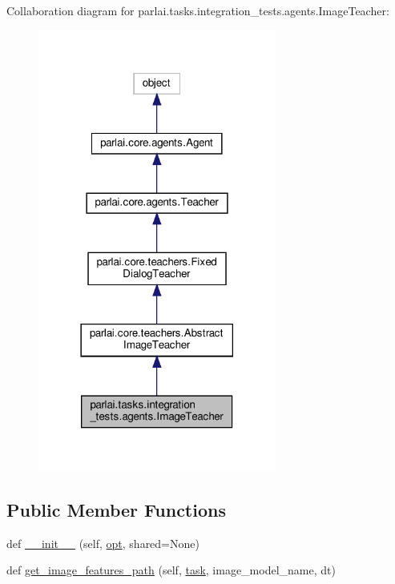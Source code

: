 Collaboration diagram for parlai.\+tasks.\+integration\+\_\+tests.\+agents.\+Image\+Teacher\+:
\nopagebreak
\begin{figure}[H]
\begin{center}
\leavevmode
\includegraphics[width=222pt]{classparlai_1_1tasks_1_1integration__tests_1_1agents_1_1ImageTeacher__coll__graph}
\end{center}
\end{figure}
\subsection*{Public Member Functions}
\begin{DoxyCompactItemize}
\item 
def \hyperlink{classparlai_1_1tasks_1_1integration__tests_1_1agents_1_1ImageTeacher_a3341d0d235586140b1c0c231a21182ff}{\+\_\+\+\_\+init\+\_\+\+\_\+} (self, \hyperlink{classparlai_1_1core_1_1teachers_1_1AbstractImageTeacher_aa7ca0df94cb27a11487e40343cc84de6}{opt}, shared=None)
\item 
def \hyperlink{classparlai_1_1tasks_1_1integration__tests_1_1agents_1_1ImageTeacher_a73c89a1d9f05891ad2a749c81814b93e}{get\+\_\+image\+\_\+features\+\_\+path} (self, \hyperlink{classparlai_1_1core_1_1teachers_1_1AbstractImageTeacher_a78dca77e43183d22d75140ca113d821c}{task}, image\+\_\+model\+\_\+name, dt)
\end{DoxyCompactItemize}
